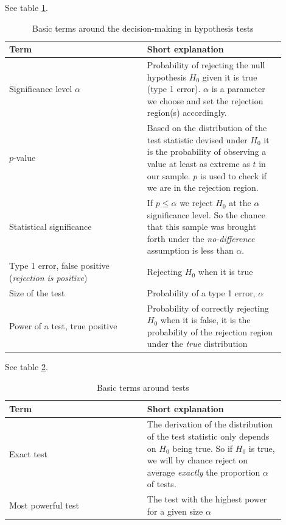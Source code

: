 See table \ref{tab:dec_mak}.
\begin{table}
    \centering
    \begin{tabular}{|p{0.45\linewidth}|p{0.45\linewidth}|}
        \hline \textcolor{blue1}{Term} & \textcolor{blue1}{Short explanation} \\
        \hline
        Significance level $\alpha$ & Probability of rejecting the null hypothesis $H_0$ given it is true (type 1 error). $\alpha$ is a
        parameter we choose and set the rejection region(s) accordingly. \\
        \hline
        $p$-value & Based on the distribution of the test statistic devised under $H_0$ it is the probability of observing a value
        at least as extreme as $t$ in our sample. $p$ is used to check if we are in the rejection region. \\
        \hline
        Statistical significance & If $p\leq \alpha$ we reject $H_0$ at the $\alpha$ significance level. So the chance
        that this sample was brought forth under the \textit{no-difference} assumption is less than $\alpha$.\\
        \hline
        Type 1 error, false positive (\textit{rejection is positive}) & Rejecting $H_0$ when it is true \\
        \hline
        Size of the test & Probability of a type 1 error, $\alpha$ \\
        \hline
        Power of a test, true positive & Probability of correctly rejecting $H_0$ when it is false, it is
        the probability of the rejection region under the \textit{true} distribution \\
        \hline
    \end{tabular}
    \caption{Basic terms around the decision-making in hypothesis tests}
    \label{tab:dec_mak}
\end{table}

See table \ref{tab:test_stats}.
\begin{table}
    \centering
    \begin{tabular}{|p{0.45\linewidth}|p{0.45\linewidth}|}
        \hline \textcolor{blue1}{Term} & \textcolor{blue1}{Short explanation} \\
        \hline
        Exact test & The derivation of the distribution of the test statistic only depends on $H_0$ being
        true. So if $H_0$ is true, we will by chance reject on average \textit{exactly} the proportion $\alpha$ of tests. \\
        \hline
        Most powerful test & The test with the highest power for a given size $\alpha$ \\
        \hline
    \end{tabular}
    \caption{Basic terms around tests}
    \label{tab:test_stats}
\end{table}

